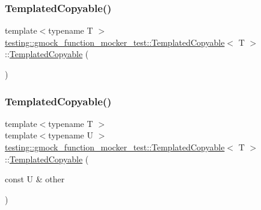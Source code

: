 \subsubsection{\texorpdfstring{TemplatedCopyable()}{TemplatedCopyable()}\hspace{0.1cm}{\footnotesize\ttfamily [1/4]}}
{\footnotesize\ttfamily template$<$typename T $>$ \\
\mbox{\hyperlink{classtesting_1_1gmock__function__mocker__test_1_1_templated_copyable}{testing\+::gmock\+\_\+function\+\_\+mocker\+\_\+test\+::\+Templated\+Copyable}}$<$ T $>$\+::\mbox{\hyperlink{classtesting_1_1gmock__function__mocker__test_1_1_templated_copyable}{Templated\+Copyable}} (\begin{DoxyParamCaption}{ }\end{DoxyParamCaption})\hspace{0.3cm}{\ttfamily [inline]}}

\mbox{\label{classtesting_1_1gmock__function__mocker__test_1_1_templated_copyable_a8af561a4e372a9a41d4d3b9de6224b42}} 
\subsubsection{\texorpdfstring{TemplatedCopyable()}{TemplatedCopyable()}\hspace{0.1cm}{\footnotesize\ttfamily [2/4]}}
{\footnotesize\ttfamily template$<$typename T $>$ \\
template$<$typename U $>$ \\
\mbox{\hyperlink{classtesting_1_1gmock__function__mocker__test_1_1_templated_copyable}{testing\+::gmock\+\_\+function\+\_\+mocker\+\_\+test\+::\+Templated\+Copyable}}$<$ T $>$\+::\mbox{\hyperlink{classtesting_1_1gmock__function__mocker__test_1_1_templated_copyable}{Templated\+Copyable}} (\begin{DoxyParamCaption}\item[{const U \&}]{other }\end{DoxyParamCaption})\hspace{0.3cm}{\ttfamily [inline]}}

